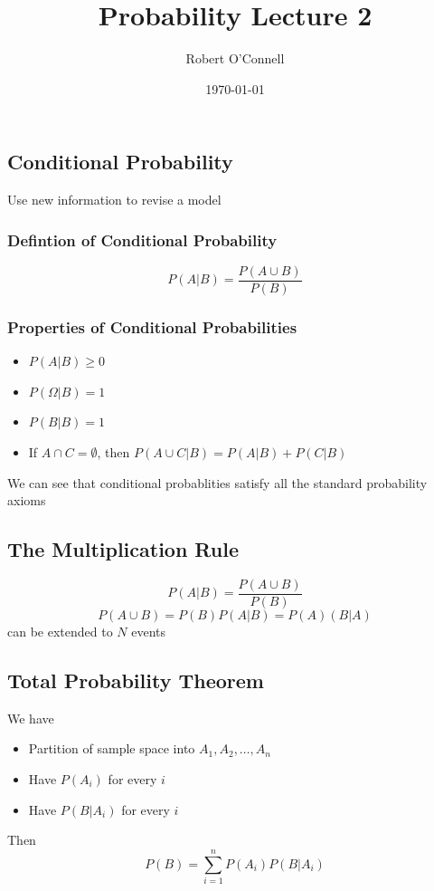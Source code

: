\documentclass{article}
\title{\textbf{Probability Lecture 2}}
\author{Robert O'Connell}
\date{\today}
\begin{document}
\maketitle
\subsection*{Conditional Probability}
Use new information to revise a model

\subsubsection*{Defintion of Conditional Probability}
\[
P(A|B) = \frac{P(A \cup B)}{P(B)}
\]

\subsubsection*{Properties of Conditional Probabilities}
\begin{itemize}
    \item \(P(A|B) \geq 0\)
    \item \(P(\Omega |B) = 1\)
    \item \(P(B|B) = 1 \)
    \item If \(A \cap C = \emptyset\), then \(P(A \cup C | B) = P(A|B) + P(C|B)\)
\end{itemize}

We can see that conditional probablities satisfy all the standard probability axioms

\subsection*{The Multiplication Rule}

\[
P(A|B) = \frac{P(A \cup B)}{P(B)}
\]
\[
P(A \cup B) = P(B)P(A|B) = P(A)(B|A)
\]
can be extended to \(N\) events

\subsection*{Total Probability Theorem}
We have
\begin{itemize}
    \item Partition of sample space into \(A_1, A_2,\dots, A_n\)
    \item Have \(P(A_i)\) for every \(i\)
    \item Have \(P(B|A_i)\) for every \(i\)
\end{itemize}

Then
\[
P(B) = \sum_{i = 1}^n P(A_i)P(B|A_i)
\]
\end{document}
